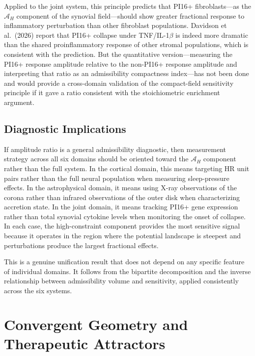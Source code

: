 \documentclass[12pt, a4paper]{article}
\theoremstyle{definition}
\begin{document}
Applied to the joint system, this principle predicts that PI16+ fibroblasts---as the $\mathcal{A}_H$ component of the synovial field---should show greater fractional response to inflammatory perturbation than other fibroblast populations. Davidson et al.\ (2026) report that PI16+ collapse under TNF/IL-1$\beta$ is indeed more dramatic than the shared proinflammatory response of other stromal populations, which is consistent with the prediction. But the quantitative version---measuring the PI16+ response amplitude relative to the non-PI16+ response amplitude and interpreting that ratio as an admissibility compactness index---has not been done and would provide a cross-domain validation of the compact-field sensitivity principle if it gave a ratio consistent with the stoichiometric enrichment argument.

\subsection{Diagnostic Implications}

If amplitude ratio is a general admissibility diagnostic, then measurement strategy across all six domains should be oriented toward the $\mathcal{A}_H$ component rather than the full system. In the cortical domain, this means targeting HR unit pairs rather than the full neural population when measuring sleep-pressure effects. In the astrophysical domain, it means using X-ray observations of the corona rather than infrared observations of the outer disk when characterizing accretion state. In the joint domain, it means tracking PI16+ gene expression rather than total synovial cytokine levels when monitoring the onset of collapse. In each case, the high-constraint component provides the most sensitive signal because it operates in the region where the potential landscape is steepest and perturbations produce the largest fractional effects.

This is a genuine unification result that does not depend on any specific feature of individual domains. It follows from the bipartite decomposition and the inverse relationship between admissibility volume and sensitivity, applied consistently across the six systems.

\section{Convergent Geometry and Therapeutic Attractors}
\end{document}
